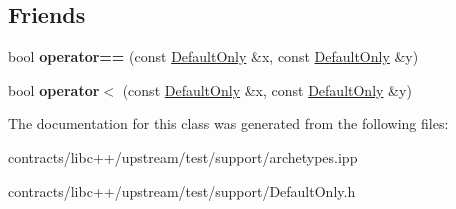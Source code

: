 \subsection*{Friends}
\begin{DoxyCompactItemize}
\item 
\mbox{\label{struct_default_only_a4c0c1aec0f8ddfe998391ba3034746f8}} 
bool {\bfseries operator==} (const \mbox{\hyperlink{struct_default_only}{Default\+Only}} \&x, const \mbox{\hyperlink{struct_default_only}{Default\+Only}} \&y)
\item 
\mbox{\label{struct_default_only_a882507fbfb7c86a669773b1a60288ce9}} 
bool {\bfseries operator$<$} (const \mbox{\hyperlink{struct_default_only}{Default\+Only}} \&x, const \mbox{\hyperlink{struct_default_only}{Default\+Only}} \&y)
\end{DoxyCompactItemize}


The documentation for this class was generated from the following files\+:\begin{DoxyCompactItemize}
\item 
contracts/libc++/upstream/test/support/archetypes.\+ipp\item 
contracts/libc++/upstream/test/support/Default\+Only.\+h\end{DoxyCompactItemize}
